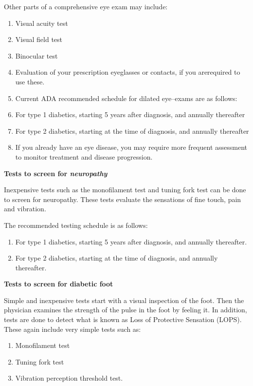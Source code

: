 \noindent Other parts of a comprehensive eye exam may include:

\begin{enumerate}[•]
\itemsep=0pt
\item Visual acuity test
\item Visual field test
\item Binocular test
\item Evaluation of your prescription eyeglasses or contacts, if you are\break required to use these.
\item Current ADA recommended schedule for dilated eye–exams are as follows:
\item For type 1 diabetics, starting 5 years after diagnosis, and annually thereafter
\item For type 2 diabetics, starting at the time of diagnosis, and annually thereafter
\item If you already have an eye disease, you may require more frequent assessment to monitor treatment and disease progression.
\end{enumerate}

\noindent\textbf{Tests to screen for \textit{neuropathy}}

Inexpensive tests such as the monofilament test and tuning fork test can be done to screen for neuropathy. These tests evaluate the sensations of fine touch, pain and vibration.

\noindent The recommended testing schedule is as follows:

\begin{enumerate}[•]
\itemsep=0pt
\item For type 1 diabetics, starting 5 years after diagnosis, and annually thereafter.
\item For type 2 diabetics, starting at the time of diagnosis, and annually thereafter.
\end{enumerate}

\noindent\textbf{Tests to screen for diabetic foot}

Simple and inexpensive tests start with a visual inspection of the foot. Then the physician examines the strength of the pulse in the foot by feeling it. In addition, tests are done to detect what is known as Loss of Protective Sensation (LOPS). These again include very simple tests such as:

\begin{enumerate}[•]
\itemsep=0pt
\item Monofilament test
\item Tuning fork test
\item Vibration perception threshold test.
\end{enumerate}

